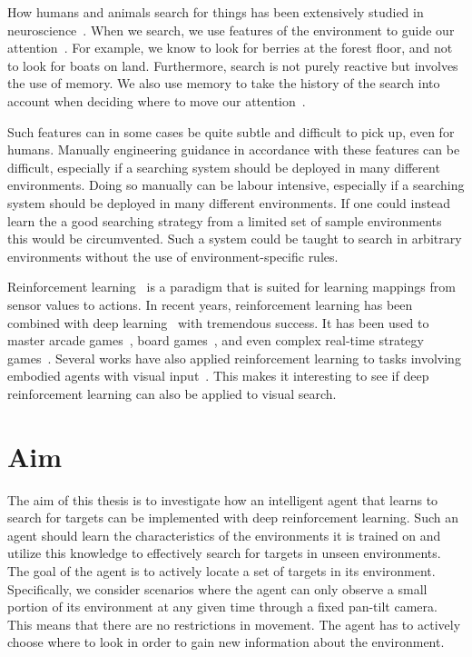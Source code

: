 How humans and animals search for things has been extensively studied in neuroscience~\cite{eckstein_visual_2011,wolfe_visual_2010,nakayama_situating_2011}.
When we search, we use features of the environment to guide our attention~\cite{wolfe_five_2017,eckstein_visual_2011}.
For example, we know to look for berries at the forest floor, and not to look for boats on land.
Furthermore, search is not purely reactive but involves the use of memory.
We also use memory to take the history of the search into account when deciding where to move our attention~\cite{wolfe_five_2017}.

Such features can in some cases be quite subtle and difficult to pick up, even for humans.
Manually engineering guidance in accordance with these features can be difficult,
especially if a searching system should be deployed in many different environments.
Doing so manually can be labour intensive, especially if a searching system should be deployed in many different environments.
If one could instead learn the a good searching strategy from a limited set of sample environments this would be circumvented.
Such a system could be taught to search in arbitrary environments without the use of environment-specific rules.

Reinforcement learning~\cite{sutton_reinforcement_2018} is a paradigm that is suited for learning mappings from sensor values to actions.
In recent years, reinforcement learning has been combined with deep learning~\cite{goodfellow_deep_2016} with tremendous success.
It has been used to master arcade games~\cite{mnih_human_2015}, board games~\cite{silver_alphago_2016}, and even complex real-time strategy games~\cite{vinyals_alphastar_2019}.
Several works have also applied reinforcement learning to tasks involving embodied agents with visual input~\cite{minut_mahadevan_2001,mnih_attention_2014,zhu_target_2016,mirowski_navigate_2017}.
This makes it interesting to see if deep reinforcement learning can also be applied to visual search.

\section{Aim}
\label{sec:aim}

The aim of this thesis is to investigate how an intelligent agent that learns to search for targets can be implemented with deep reinforcement learning.
Such an agent should learn the characteristics of the environments it is trained on and utilize this knowledge to effectively search for targets in unseen environments.
The goal of the agent is to actively locate a set of targets in its environment.
Specifically, we consider scenarios where the agent can only observe a small portion of its environment at any given time through a fixed pan-tilt camera.
This means that there are no restrictions in movement.
The agent has to actively choose where to look in order to gain new information about the environment.


